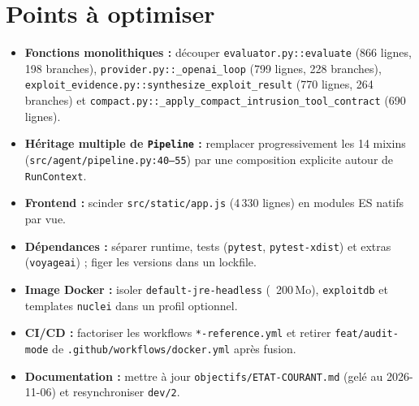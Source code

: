 \documentclass[11pt,a4paper]{article}
\begin{document}
\section{Points à optimiser}
\begin{itemize}
  \item \textbf{Fonctions monolithiques :} découper \texttt{evaluator.py::evaluate} (866 lignes, 198 branches), \texttt{provider.py::\_openai\_loop} (799 lignes, 228 branches), \texttt{exploit\_evidence.py::synthesize\_exploit\_result} (770 lignes, 264 branches) et \texttt{compact.py::\_apply\_compact\_intrusion\_tool\_contract} (690 lignes).
  \item \textbf{Héritage multiple de \texttt{Pipeline} :} remplacer progressivement les 14 mixins (\texttt{src/agent/pipeline.py:40--55}) par une composition explicite autour de \texttt{RunContext}.
  \item \textbf{Frontend :} scinder \texttt{src/static/app.js} (4\,330 lignes) en modules ES natifs par vue.
  \item \textbf{Dépendances :} séparer runtime, tests (\texttt{pytest}, \texttt{pytest-xdist}) et extras (\texttt{voyageai}) ; figer les versions dans un lockfile.
  \item \textbf{Image Docker :} isoler \texttt{default-jre-headless} (~200\,Mo), \texttt{exploitdb} et templates \texttt{nuclei} dans un profil optionnel.
  \item \textbf{CI/CD :} factoriser les workflows \texttt{*-reference.yml} et retirer \texttt{feat/audit-mode} de \texttt{.github/workflows/docker.yml} après fusion.
  \item \textbf{Documentation :} mettre à jour \texttt{objectifs/ETAT-COURANT.md} (gelé au 2026-11-06) et resynchroniser \texttt{dev/2}.
\end{itemize}
\end{document}
